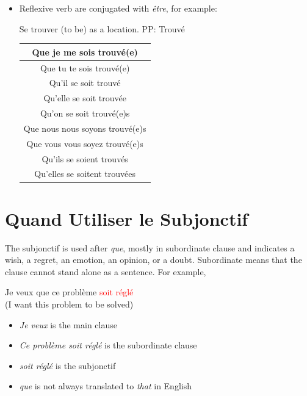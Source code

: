 \documentclass{book}
\begin{document}
\begin{itemize}
            \item Reflexive verb are conjugated with \textit{être}, for example:
                \begin{center}
                    Se trouver (to be) as a location. PP: Trouvé \\
                    \begin{tabular}{|c|}
                        \hline
                        Que je me sois trouvé(e) \\
                        \hline
                        Que tu te sois trouvé(e) \\
                        \hline
                        Qu'il se soit trouvé \\
                        \hline
                        Qu'elle se soit trouvée \\
                        \hline
                        Qu'on se soit trouvé(e)s \\
                        \hline
                        Que nous nous soyons trouvé(e)s \\
                        \hline
                        Que vous vous soyez trouvé(e)s \\
                        \hline
                        Qu'ils se soient trouvés \\
                        \hline
                        Qu'elles se soitent trouvées \\
                        \hline
                    \end{tabular}
                \end{center}
        \end{itemize}

\section{Quand Utiliser le Subjonctif}
    The subjonctif is used after \textit{que}, mostly in subordinate clause and indicates a wish, a regret, an emotion, an opinion, or a doubt. Subordinate means that the clause cannot stand alone as a sentence. For example,
        \begin{center}
            Je veux que ce problème \textcolor{red}{soit réglé} \\
            (I want this problem to be solved)
        \end{center}
        \begin{itemize}
            \item \textit{Je veux} is the main clause
            \item \textit{Ce problème soit réglé} is the subordinate clause
            \item \textit{soit réglé} is the subjonctif
            \item \textit{que} is not always translated to \textit{that} in English
        \end{itemize}
        
\end{document}
